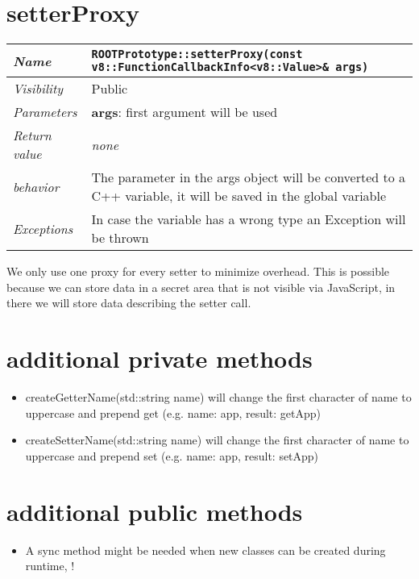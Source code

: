 \section{setterProxy}
\begin{longtable}{p{3cm} @{\hskip 1cm} p{12cm}}
  \hline
  \textit{Name} & \texttt{ROOTPrototype::setterProxy(const v8::FunctionCallbackInfo<v8::Value>\& args)} \\
  \hline
  \textit{Visibility} & Public \\
  \hline
  \textit{Parameters} & \textbf{args}: first argument will be used \\
  \hline
  \textit{Return value} & \textit{none} \\
  \hline
  \textit{behavior} & The parameter in the args object will be converted to a C++ variable, it will be saved in the global variable\\
  \hline
  \textit{Exceptions} & In case the variable has a wrong type an Exception will be thrown
  \hline
\end{longtable}
We only use one proxy for every setter to minimize overhead. This is possible because we can store data in a secret area that is not visible via JavaScript, in there we will store data describing the setter call.
\newpage
\section{additional private methods}
\begin{itemize}
  \item createGetterName(std::string name) will change the first character of name to uppercase and prepend get (e.g. name: app, result: getApp)
  \item createSetterName(std::string name) will change the first character of name to uppercase and prepend set (e.g. name: app, result: setApp)
\end{itemize}
\section{additional public methods}
\begin{itemize}
  \item A sync method might be needed when new classes can be created during runtime, \color{red}{need to evaluate this}!
\end{itemize}
